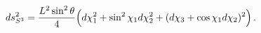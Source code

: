 \begin{equation}
ds^2_{S^3}=\frac{L^2\sin^2{\theta}}{4}\Bigl(d\chi_1^2+\sin^2{\chi_1}d\chi_2^2+
(d\chi_3+\cos{\chi_1}d\chi_2)^2\Bigr)\, .
\end{equation}


